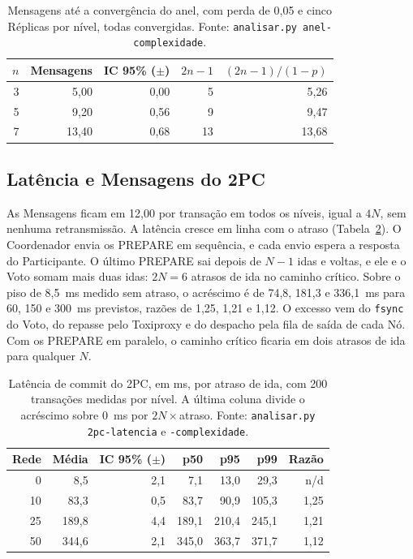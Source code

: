 \documentclass[conference]{IEEEtran}
\newcommand{\cod}[1]{\texttt{\upshape #1}}
\begin{document}
\begin{table}[t]
\caption{Mensagens até a convergência do anel, com perda de 0,05 e cinco Réplicas por nível,
todas convergidas. Fonte: \cod{analisar.py anel-complexidade}.}
\label{tab:anel}
\centering
\footnotesize
\begin{tabular}{@{}rrrrr@{}}
\toprule
$n$ & Mensagens & IC 95\% ($\pm$) & $2n-1$ & $(2n-1)/(1-p)$ \\
\midrule
3 & 5,00  & 0,00 & 5  & 5,26  \\
5 & 9,20  & 0,56 & 9  & 9,47  \\
7 & 13,40 & 0,68 & 13 & 13,68 \\
\bottomrule
\end{tabular}
\end{table}

\subsection{Latência e Mensagens do 2PC}
As Mensagens ficam em 12,00 por transação em todos os níveis, igual a $4N$, sem nenhuma
retransmissão. A latência cresce em linha com o atraso (Tabela~\ref{tab:2pc-lat}). O Coordenador envia os PREPARE em sequência, e cada envio espera a resposta
do Participante. O último PREPARE sai depois de $N-1$ idas e voltas, e ele e o Voto somam mais duas
idas: $2N=6$ atrasos de ida no caminho crítico. Sobre o piso de 8,5~ms medido sem atraso, o
acréscimo é de 74,8, 181,3 e 336,1~ms para 60, 150 e 300~ms previstos, razões de 1,25, 1,21 e 1,12.
O excesso vem do \cod{fsync} do Voto, do repasse pelo Toxiproxy e do despacho pela fila de saída de
cada Nó. Com os PREPARE em paralelo, o caminho crítico ficaria em dois atrasos de ida para
qualquer $N$.

\begin{table}[t]
\caption{Latência de commit do 2PC, em ms, por atraso de ida, com 200 transações medidas por
nível. A última coluna divide o acréscimo sobre 0~ms por $2N\times$atraso. Fonte:
\cod{analisar.py 2pc-latencia} e \cod{2pc-complexidade}.}
\label{tab:2pc-lat}
\centering
\footnotesize
\setlength{\tabcolsep}{4pt}
\begin{tabular}{@{}rrrrrrr@{}}
\toprule
Rede & Média & IC 95\% ($\pm$) & p50 & p95 & p99 & Razão \\
\midrule
0  & 8,5   & 2,1 & 7,1   & 13,0  & 29,3  & n/d  \\
10 & 83,3  & 0,5 & 83,7  & 90,9  & 105,3 & 1,25 \\
25 & 189,8 & 4,4 & 189,1 & 210,4 & 245,1 & 1,21 \\
50 & 344,6 & 2,1 & 345,0 & 363,7 & 371,7 & 1,12 \\
\bottomrule
\end{tabular}
\end{table}
\end{document}
